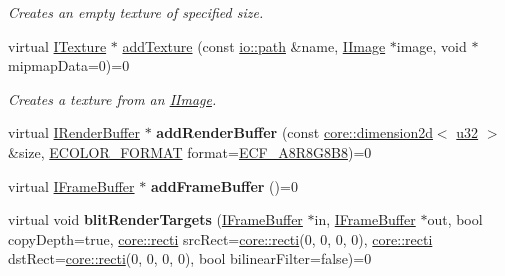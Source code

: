 \begin{DoxyCompactItemize}
\begin{DoxyCompactList}\small\item\em Creates an empty texture of specified size. \end{DoxyCompactList}\item 
virtual \hyperlink{classirr_1_1video_1_1ITexture}{I\+Texture} $\ast$ \hyperlink{classirr_1_1video_1_1IVideoDriver_abfebeb09a692c0d6b4741d952d97668e}{add\+Texture} (const \hyperlink{namespaceirr_1_1io_ab1bdc45edb3f94d8319c02bc0f840ee1}{io\+::path} \&name, \hyperlink{classirr_1_1video_1_1IImage}{I\+Image} $\ast$image, void $\ast$mipmap\+Data=0)=0
\begin{DoxyCompactList}\small\item\em Creates a texture from an \hyperlink{classirr_1_1video_1_1IImage}{I\+Image}. \end{DoxyCompactList}\item 
virtual \hyperlink{classirr_1_1video_1_1IRenderBuffer}{I\+Render\+Buffer} $\ast$ {\bfseries add\+Render\+Buffer} (const \hyperlink{classirr_1_1core_1_1dimension2d}{core\+::dimension2d}$<$ \hyperlink{namespaceirr_a0416a53257075833e7002efd0a18e804}{u32} $>$ \&size, \hyperlink{namespaceirr_1_1video_a1d5e487888c32b1674a8f75116d829ed}{E\+C\+O\+L\+O\+R\+\_\+\+F\+O\+R\+M\+AT} format=\hyperlink{namespaceirr_1_1video_a1d5e487888c32b1674a8f75116d829eda55c57d63efff39efe33ee733fe962df0}{E\+C\+F\+\_\+\+A8\+R8\+G8\+B8})=0\hypertarget{classirr_1_1video_1_1IVideoDriver_a4c57d9a7ea6df655946b55d0b06431f9}{}\label{classirr_1_1video_1_1IVideoDriver_a4c57d9a7ea6df655946b55d0b06431f9}

\item 
virtual \hyperlink{classirr_1_1video_1_1IFrameBuffer}{I\+Frame\+Buffer} $\ast$ {\bfseries add\+Frame\+Buffer} ()=0\hypertarget{classirr_1_1video_1_1IVideoDriver_a3d5b472fbe5fbbe0d7d40a69bb71b58a}{}\label{classirr_1_1video_1_1IVideoDriver_a3d5b472fbe5fbbe0d7d40a69bb71b58a}

\item 
virtual void {\bfseries blit\+Render\+Targets} (\hyperlink{classirr_1_1video_1_1IFrameBuffer}{I\+Frame\+Buffer} $\ast$in, \hyperlink{classirr_1_1video_1_1IFrameBuffer}{I\+Frame\+Buffer} $\ast$out, bool copy\+Depth=true, \hyperlink{namespaceirr_1_1core_a628365d56b9d3ca9c887cd7f651f7b45}{core\+::recti} src\+Rect=\hyperlink{namespaceirr_1_1core_a628365d56b9d3ca9c887cd7f651f7b45}{core\+::recti}(0, 0, 0, 0), \hyperlink{namespaceirr_1_1core_a628365d56b9d3ca9c887cd7f651f7b45}{core\+::recti} dst\+Rect=\hyperlink{namespaceirr_1_1core_a628365d56b9d3ca9c887cd7f651f7b45}{core\+::recti}(0, 0, 0, 0), bool bilinear\+Filter=false)=0\hypertarget{classirr_1_1video_1_1IVideoDriver_a1e066a013cb212d7f469b7f4deeb1f37}{}\label{classirr_1_1video_1_1IVideoDriver_a1e066a013cb212d7f469b7f4deeb1f37}


\end{DoxyCompactItemize}
